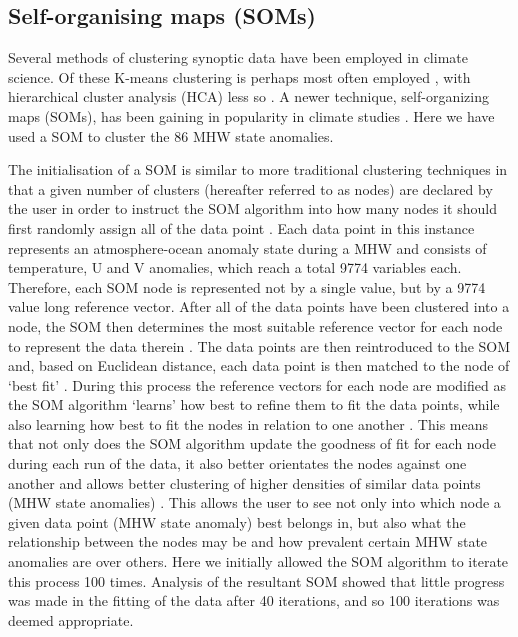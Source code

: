 \documentclass[utf8]{frontiersSCNS}
\begin{document}
\subsection{Self-organising maps (SOMs)}
Several methods of clustering synoptic data have been employed in climate science. Of these K-means clustering is perhaps most often employed \citep[e.g.][]{Corte-Real1998, Burrough2001, Kumar2011}, with hierarchical cluster analysis (HCA) less so \citep[e.g.][]{Unal2003}. A newer technique, self-organizing maps (SOMs), has been gaining in popularity in climate studies \citep[e.g.][]{Cavazos2000, Hewitson2002, Morioka2010}. Here we have used a SOM to cluster the 86 MHW state anomalies.

The initialisation of a SOM is similar to more traditional clustering techniques \citep[\emph{e.g.}][]{Jain2010} in that a given number of clusters (hereafter referred to as nodes) are declared by the user in order to instruct the SOM algorithm into how many nodes it should first randomly assign all of the data point \citep{Hewitson2002}. Each data point in this instance represents an atmosphere-ocean anomaly state during a MHW and consists of temperature, U and V anomalies, which reach a total 9774 variables each. Therefore, each SOM node is represented not by a single value, but by a 9774 value long reference vector. After all of the data points have been clustered into a node, the SOM then determines the most suitable reference vector for each node to represent the data therein \citep{Hewitson2002}. The data points are then reintroduced to the SOM and, based on Euclidean distance, each data point is then matched to the node of `best fit' \citep{Hewitson2002}. During this process the reference vectors for each node are modified as the SOM algorithm `learns' how best to refine them to fit the data points, while also learning how best to fit the nodes in relation to one another \citep{Hewitson2002}. This means that not only does the SOM algorithm update the goodness of fit for each node during each run of the data, it also better orientates the nodes against one another and allows better clustering of higher densities of similar data points (MHW state anomalies) \citep{Hewitson2002}. This allows the user to see not only into which node a given data point (MHW state anomaly) best belongs in, but also what the relationship between the nodes may be and how prevalent certain MHW state anomalies are over others. Here we initially allowed the SOM algorithm to iterate this process 100 times. Analysis of the resultant SOM showed that little progress was made in the fitting of the data after 40 iterations, and so 100 iterations was deemed appropriate.
\end{document}
